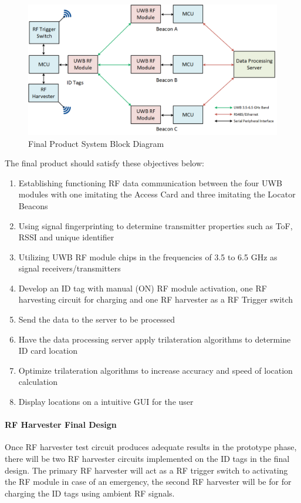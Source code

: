 \begin{figure}[h!]
    \centering
    \includegraphics[width=\linewidth]{./images/03_sys_Final.png}
    \caption{Final Product System Block Diagram}
    \label{final_prod_sys_blk}
\end{figure}
\bigskip

The final product should satisfy these objectives below:

\begin{enumerate}
    \item Establishing functioning RF data communication between the four UWB modules with
    one imitating the Access Card and three imitating the Locator Beacons
    \item Using signal fingerprinting to determine transmitter properties such as ToF, RSSI
    and unique identifier
    \item Utilizing UWB RF module chips in the frequencies of 3.5 to 6.5 GHz as signal receivers/transmitters
    \item Develop an ID tag with manual (ON) RF module activation, one RF harvesting circuit
    for charging and one RF harvester as a RF Trigger switch
    \item Send the data to the server to be processed
    \item Have the data processing server apply trilateration algorithms to determine ID card location
    \item Optimize trilateration algorithms to increase accuracy and speed of location calculation
    \item Display locations on a intuitive GUI for the user
\end{enumerate}

\break
\paragraph{RF Harvester Final Design}
Once RF harvester test circuit produces adequate results in the prototype phase, there will be two RF harvester circuits implemented on the ID tags in the final design. The primary RF harvester will act as a RF trigger switch to activating the RF module in case of an emergency, the second RF harvester will be for for charging the ID tags using ambient RF signals.

